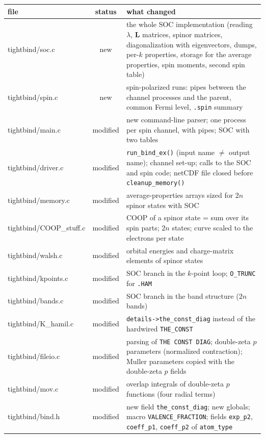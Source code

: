 \documentclass[11pt,a4paper]{article}
\newcommand{\fn}[1]{\texttt{#1()}}
\newcommand{\var}[1]{\texttt{#1}}
\begin{document}
\begin{longtable}{>{\ttfamily\small\raggedright}p{4.7cm} c p{8.4cm}}
\toprule
\textrm{\textbf{file}} & \textbf{status} & \textbf{what changed} \\
\midrule
\endhead
tightbind/soc.c        & new      & the whole SOC implementation (reading $\lambda$, $\mathbf{L}$ matrices, spinor matrices, diagonalization with eigenvectors, dumps, per-$k$ properties, storage for the average properties, spin moments, second spin table) \\
tightbind/spin.c       & new      & spin-polarized runs: pipes between the channel processes and the parent, common Fermi level, \texttt{.spin} summary \\
tightbind/main.c       & modified & new command-line parser; one process per spin channel, with pipes; SOC with two tables \\
tightbind/driver.c     & modified & \fn{run\_bind\_ex} (input name $\neq$ output name); channel set-up; calls to the SOC and spin code; netCDF file closed before \fn{cleanup\_memory} \\
tightbind/memory.c     & modified & average-properties arrays sized for $2n$ spinor states with SOC \\
tightbind/COOP\_stuff.c & modified & COOP of a spinor state = sum over its spin parts; $2n$ states; curve scaled to the electrons per state \\
tightbind/walsh.c      & modified & orbital energies and charge-matrix elements of spinor states \\
tightbind/kpoints.c    & modified & SOC branch in the $k$-point loop; \texttt{O\_TRUNC} for \texttt{.HAM} \\
tightbind/bands.c      & modified & SOC branch in the band structure ($2n$ bands) \\
tightbind/K\_hamil.c   & modified & \var{details->the\_const\_diag} instead of the hardwired \var{THE\_CONST} \\
tightbind/fileio.c     & modified & parsing of \texttt{THE CONST DIAG}; double-zeta $p$ parameters (normalized contraction); Muller parameters copied with the double-zeta $p$ fields \\
tightbind/mov.c        & modified & overlap integrals of double-zeta $p$ functions (four radial terms) \\
tightbind/bind.h       & modified & new field \var{the\_const\_diag}; new globals; macro \var{VALENCE\_FRACTION}; fields \var{exp\_p2}, \var{coeff\_p1}, \var{coeff\_p2} of \var{atom\_type} \\

\end{longtable}
\end{document}
